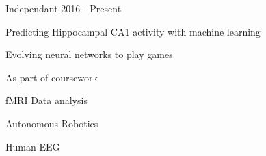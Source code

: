 \begin{cventries}
\cvrpentry
    {Independant} %
    {} %
    {} %
    {2016 - Present} %
    {
      \begin{cvitems} %
        \item {Predicting Hippocampal CA1 activity with machine learning}
	\item {Evolving neural networks to play games}
      \end{cvitems}
    }

\cvrpentry
    {As part of coursework} %
    {} %
    {} %
    {} %
    {
      \begin{cvitems} %
        \item {fMRI Data analysis}
	\item {Autonomous Robotics}
	\item{Human EEG}
      \end{cvitems}
    }




\end{cventries}
